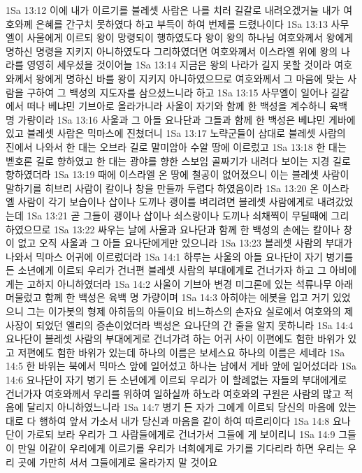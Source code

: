 1Sa 13:12  이에 내가 이르기를 블레셋 사람은 나를 치러 길갈로 내려오겠거늘 내가 여호와께 은혜를 간구치 못하였다 하고 부득이 하여 번제를 드렸나이다
1Sa 13:13  사무엘이 사울에게 이르되 왕이 망령되이 행하였도다 왕이 왕의 하나님 여호와께서 왕에게 명하신 명령을 지키지 아니하였도다 그리하였더면 여호와께서 이스라엘 위에 왕의 나라를 영영히 세우셨을 것이어늘
1Sa 13:14  지금은 왕의 나라가 길지 못할 것이라 여호와께서 왕에게 명하신 바를 왕이 지키지 아니하였으므로 여호와께서 그 마음에 맞는 사람을 구하여 그 백성의 지도자를 삼으셨느니라 하고
1Sa 13:15  사무엘이 일어나 길갈에서 떠나 베냐민 기브아로 올라가니라 사울이 자기와 함께 한 백성을 계수하니 육백 명 가량이라
1Sa 13:16  사울과 그 아들 요나단과 그들과 함께 한 백성은 베냐민 게바에 있고 블레셋 사람은 믹마스에 진쳤더니
1Sa 13:17  노략군들이 삼대로 블레셋 사람의 진에서 나와서 한 대는 오브라 길로 말미암아 수알 땅에 이르렀고
1Sa 13:18  한 대는 벧호론 길로 향하였고 한 대는 광야를 향한 스보임 골짜기가 내려다 보이는 지경 길로 향하였더라
1Sa 13:19  때에 이스라엘 온 땅에 철공이 없어졌으니 이는 블레셋 사람이 말하기를 히브리 사람이 칼이나 창을 만들까 두렵다 하였음이라
1Sa 13:20  온 이스라엘 사람이 각기 보습이나 삽이나 도끼나 괭이를 벼리려면 블레셋 사람에게로 내려갔었는데
1Sa 13:21  곧 그들이 괭이나 삽이나 쇠스랑이나 도끼나 쇠채찍이 무딜때에 그리하였으므로
1Sa 13:22  싸우는 날에 사울과 요나단과 함께 한 백성의 손에는 칼이나 창이 없고 오직 사울과 그 아들 요나단에게만 있으니라
1Sa 13:23  블레셋 사람의 부대가 나와서 믹마스 어귀에 이르렀더라
1Sa 14:1  하루는 사울의 아들 요나단이 자기 병기를 든 소년에게 이르되 우리가 건너편 블레셋 사람의 부대에게로 건너가자 하고 그 아비에게는 고하지 아니하였더라
1Sa 14:2  사울이 기브아 변경 미그론에 있는 석류나무 아래 머물렀고 함께 한 백성은 육백 명 가량이며
1Sa 14:3  아히야는 에봇을 입고 거기 있었으니 그는 이가봇의 형제 아히둡의 아들이요 비느하스의 손자요 실로에서 여호와의 제사장이 되었던 엘리의 증손이었더라 백성은 요나단의 간 줄을 알지 못하니라
1Sa 14:4  요나단이 블레셋 사람의 부대에게로 건너가려 하는 어귀 사이 이편에도 험한 바위가 있고 저편에도 험한 바위가 있는데 하나의 이름은 보세스요 하나의 이름은 세네라
1Sa 14:5  한 바위는 북에서 믹마스 앞에 일어섰고 하나는 남에서 게바 앞에 일어섰더라
1Sa 14:6  요나단이 자기 병기 든 소년에게 이르되 우리가 이 할례없는 자들의 부대에게로 건너가자 여호와께서 우리를 위하여 일하실까 하노라 여호와의 구원은 사람의 많고 적음에 달리지 아니하였느니라
1Sa 14:7  병기 든 자가 그에게 이르되 당신의 마음에 있는 대로 다 행하여 앞서 가소서 내가 당신과 마음을 같이 하여 따르리이다
1Sa 14:8  요나단이 가로되 보라 우리가 그 사람들에게로 건너가서 그들에 게 보이리니
1Sa 14:9  그들이 만일 이같이 우리에게 이르기를 우리가 너희에게로 가기를 기다리라 하면 우리는 우리 곳에 가만히 서서 그들에게로 올라가지 말 것이요
